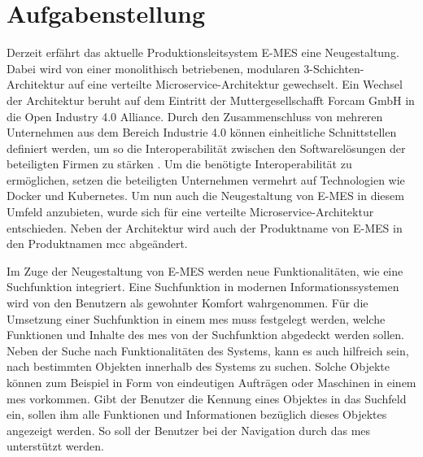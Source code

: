 \section{Aufgabenstellung\label{sec1.2:Unterpunkt-2}}

Derzeit erfährt das aktuelle Produktionsleitsystem E-MES eine Neugestaltung. Dabei wird von einer monolithisch betriebenen, modularen 3-Schichten-Architektur auf eine verteilte Microservice-Architektur gewechselt. Ein Wechsel der Architektur beruht auf dem Eintritt der Muttergesellschafft Forcam GmbH in die \glqq Open Industry 4.0 Alliance\grqq{}. Durch den Zusammenschluss von mehreren Unternehmen aus dem Bereich \glqq Industrie 4.0\grqq{} können einheitliche Schnittstellen definiert werden, um so die Interoperabilität zwischen den Softwarelösungen der beteiligten Firmen zu stärken \cite{OpenIndustry4.0Alliance.2021}. Um die benötigte Interoperabilität zu ermöglichen, setzen die beteiligten Unternehmen vermehrt auf Technologien wie Docker und Kubernetes. Um nun auch die Neugestaltung von E-MES in diesem Umfeld anzubieten, wurde sich für eine verteilte Microservice-Architektur entschieden. Neben der Architektur wird auch der Produktname von \glqq E-MES\grqq{} in den Produktnamen \glqq \gls{mcc}\grqq{} abgeändert.


Im Zuge der Neugestaltung von E-MES werden neue Funktionalitäten, wie eine Suchfunktion integriert. Eine Suchfunktion in modernen Informationssystemen wird von den Benutzern als gewohnter Komfort wahrgenommen. Für die Umsetzung einer Suchfunktion in einem \gls{mes} muss festgelegt werden, welche Funktionen und Inhalte des \gls{mes} von der Suchfunktion abgedeckt werden sollen. Neben der Suche nach Funktionalitäten des Systems, kann es auch hilfreich sein, nach bestimmten \glqq Objekten\grqq{} innerhalb des Systems zu suchen. Solche Objekte können zum Beispiel in Form von eindeutigen Aufträgen oder Maschinen in einem \gls{mes} vorkommen. Gibt der Benutzer die Kennung eines Objektes in das Suchfeld ein, sollen ihm alle Funktionen und Informationen bezüglich dieses Objektes angezeigt werden. So soll der Benutzer bei der Navigation durch das \gls{mes} unterstützt werden.

